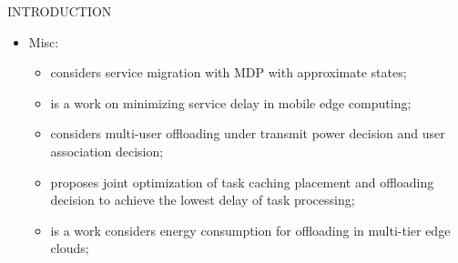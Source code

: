 \documentclass[10pt, conference, letterpaper]{IEEEtran}
\begin{document}
\begin{section}{INTRODUCTION}
\begin{itemize}
            \item Misc:
                \begin{itemize}
                    \item {} \cite{Wang2015} considers service migration with MDP with approximate states;
                    \item \cite{Rodrigues2017} is a work on minimizing service delay in mobile edge computing;
                    \item \cite{Zhang2018} considers multi-user offloading under transmit power decision and user association decision;
                    \item \cite{Chen2018a} proposes joint optimization of task caching placement and offloading decision to achieve the lowest delay of task processing;
                    \item \cite{ElHaber2019} is a work considers energy consumption for offloading in multi-tier edge clouds;
                \end{itemize}
        \end{itemize}

    \end{section}
\end{document}
